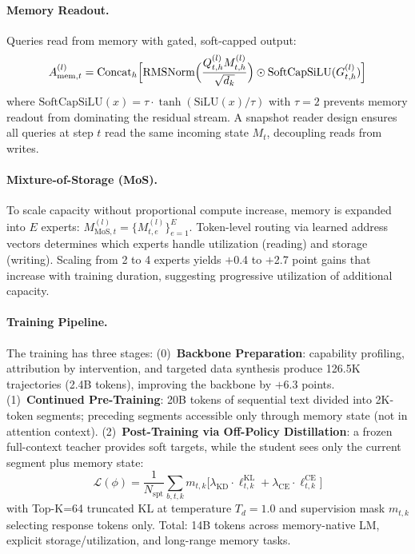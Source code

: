 \documentclass[11pt,a4paper]{article}
\begin{document}
\paragraph{Memory Readout.}
Queries read from memory with gated, soft-capped output:
\begin{equation}
A^{(l)}_{\text{mem},t} = \text{Concat}_h \Bigl[\text{RMSNorm}\Bigl(\frac{Q^{(l)}_{t,h} M^{(l)}_{t,h}}{\sqrt{d_k}}\Bigr) \odot \text{SoftCapSiLU}(G^{(l)}_{t,h})\Bigr]
\end{equation}
where $\text{SoftCapSiLU}(x) = \tau \cdot \tanh(\text{SiLU}(x)/\tau)$ with $\tau{=}2$ prevents memory readout from dominating the residual stream. A snapshot reader design ensures all queries at step $t$ read the same incoming state $M_t$, decoupling reads from writes.

\paragraph{Mixture-of-Storage (MoS).}
To scale capacity without proportional compute increase, memory is expanded into $E$ experts: $M^{(l)}_{\text{MoS},t} = \{M^{(l)}_{t,e}\}_{e=1}^E$. Token-level routing via learned address vectors determines which experts handle utilization (reading) and storage (writing). Scaling from 2 to 4 experts yields $+$0.4 to $+$2.7 point gains that increase with training duration, suggesting progressive utilization of additional capacity.

\paragraph{Training Pipeline.}
The training has three stages: (0)~\textbf{Backbone Preparation}: capability profiling, attribution by intervention, and targeted data synthesis produce 126.5K trajectories (2.4B tokens), improving the backbone by $+$6.3 points. (1)~\textbf{Continued Pre-Training}: 20B tokens of sequential text divided into 2K-token segments; preceding segments accessible only through memory state (not in attention context). (2)~\textbf{Post-Training via Off-Policy Distillation}: a frozen full-context teacher provides soft targets, while the student sees only the current segment plus memory state:
\begin{equation}
\mathcal{L}(\phi) = \frac{1}{N_{\text{spt}}} \sum_{b,t,k} m_{t,k} \bigl[\lambda_{\text{KD}} \cdot \ell^{\text{KL}}_{t,k} + \lambda_{\text{CE}} \cdot \ell^{\text{CE}}_{t,k}\bigr]
\end{equation}
with Top-K=64 truncated KL at temperature $T_d{=}1.0$ and supervision mask $m_{t,k}$ selecting response tokens only. Total: 14B tokens across memory-native LM, explicit storage/utilization, and long-range memory tasks.
\end{document}

